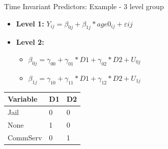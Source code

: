 \documentclass[ignorenonframetext,]{beamer}
\begin{document}
\begin{frame}{Time Invariant Predictors: Example - 3 level group}

\begin{itemize}
  \item \textbf{Level 1:} $Y_{ij} = \beta_{0j} + \beta_{1j}*age0_{ij} + \varepsilon{ij}$
  \item \textbf{Level 2:} 
    \begin{itemize} 
      \item $\beta_{0j} = \gamma_{00} + \gamma_{01}*D1 + \gamma_{02}*D2 + U_{0j}$
      \item $\beta_{1j} = \gamma_{10} + \gamma_{11}*D1 + \gamma_{12}*D2 + U_{1j}$
    \end{itemize}
\end{itemize}

\begin{longtable}[]{@{}lll@{}}
\toprule
Variable & D1 & D2\tabularnewline
\midrule
\endhead
Jail & 0 & 0\tabularnewline
None & 1 & 0\tabularnewline
CommServ & 0 & 1\tabularnewline
\bottomrule
\end{longtable}

\end{frame}
\end{document}
